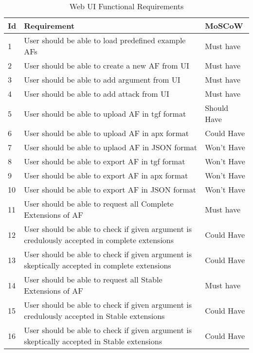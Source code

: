 \begin{longtable}[c]{|p{0.5cm}|p{10cm}|p{2.5cm}|}
	\caption{Web UI Functional Requirements}
	\label{table:webUiRequirements}\\
	\hline
	\textbf{Id} & \textbf{Requirement} & \textbf{MoSCoW} \\ \hline \hline
	\endfirsthead
	\endhead
	1 & User should be able to load predefined example AFs & Must have \\ \hline
	2 & User should be able to create a new AF from UI & Must have \\ \hline
	3 & User should be able to add argument from UI & Must have \\ \hline
	4 & User should be able to add attack from UI & Must have \\ \hline
	5 & User should be able to upload AF in tgf format & Should Have \\ \hline
	6 & User should be able to upload AF in apx format & Could Have \\ \hline
	7 & User should be able to uplaod AF in JSON format & Won't Have \\ \hline
	8 & User should be able to export AF in tgf format & Won't Have \\ \hline
	9 & User should be able to export AF in apx format & Won't Have \\ \hline
	10 & User should be able to export AF in JSON format & Won't Have \\ \hline
	11 & User should be able to request all Complete Extensions of AF & Must have \\ \hline
	12 & User should be able to check if given argument is credulously accepted in complete extensions & Could Have \\ \hline
	13 & User should be able to check if given argument is skeptically accepted in complete extensions & Could Have \\ \hline
	14 & User should be able to request all Stable Extensions of AF & Must have \\ \hline
	15 & User should be able to check if given argument is credulously accepted in Stable extensions & Could Have \\ \hline
	16 & User should be able to check if given argument is skeptically accepted in Stable extensions & Could Have \\ \hline

\end{longtable}
